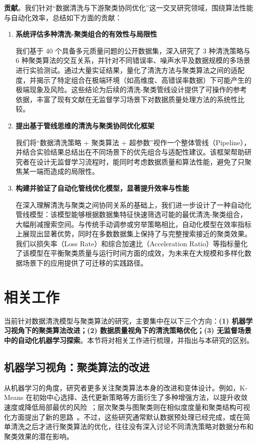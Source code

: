 \documentclass[10pt]{article} %
\numberwithin{equation}{section}
\begin{document}
\textbf{贡献}。我们针对“数据清洗与下游聚类协同优化”这一交叉研究领域，围绕算法性能与自动化效率，总结如下方面的贡献：
\begin{enumerate}
    \item \textbf{系统评估多种清洗-聚类组合的有效性与局限性}  

    我们基于 40 个具备多元质量问题的公开数据集，深入研究了 3 种清洗策略与 6 种聚类算法的交互关系，并针对不同错误率、噪声水平及数据规模的多场景进行实验测试。通过大量实证结果，量化了清洗方法与聚类算法之间的适配度，并揭示了特定组合在极端环境（如高维度、高错误率数据）下可能产生的极端现象及风险。这些结论为后续的清洗-聚类管线设计提供了可操作的参考依据，丰富了现有文献在无监督学习场景下对数据质量处理方法的系统性比较。

    \item \textbf{提出基于管线思维的清洗与聚类协同优化框架}  

    我们将“数据清洗策略 + 聚类算法 + 超参数”视作一个整体管线（Pipeline），并结合实验结果总结出在不同场景下的优先组合与适配性建议。该框架帮助研究者在设计无监督学习流程时，能同时考虑数据质量和算法性能，避免了只聚焦某一端而造成的局限性。

    \item \textbf{构建并验证了自动化管线优化模型，显著提升效率与性能}  

    在深入理解清洗与聚类之间协同关系的基础上，我们进一步设计了一种自动化管线模型：该模型能够根据数据集特征快速筛选可能的最优清洗-聚类组合，大幅削减搜索空间。与传统手动调参或穷举策略相比，自动化模型在效率指标上展现出显著优势，同时在多数数据集上保持了与完整搜索接近的聚类效果。我们以损失率（Loss Rate）和综合加速比（Acceleration Ratio）等指标量化了该模型在平衡聚类质量与运行时间方面的成效，为未来在大规模和多样化数据场景下的应用提供了可迁移的实践路径。

\end{enumerate}


\section{相关工作}\label{sec:related_work}

当前针对数据清洗模型与聚类算法的研究，主要集中在以下三个方向：\textbf{(1) 机器学习视角下的聚类算法改进；(2) 数据质量视角下的清洗策略优化；(3) 无监督场景中的自动化机器学习探索}。本节将对相关工作进行梳理，并指出与本研究的区别。

\subsection{机器学习视角：聚类算法的改进}
从机器学习的角度，研究者更多关注聚类算法本身的改进和变体设计。例如，K-Means 在初始中心选择、迭代更新策略等方面衍生了多种增强方法，以提升收敛速度或降低局部最优的风险~\cite{ref8, ref9}；层次聚类与图聚类则在相似度度量和聚类结构可视化方面提出了新的思路~\cite{ref10}。不过，这些研究通常默认数据预处理已经完成，或在简单清洗之后才进行聚类算法的优化，往往没有深入讨论不同清洗策略对数据分布和聚类效果的潜在影响。
\end{document}
